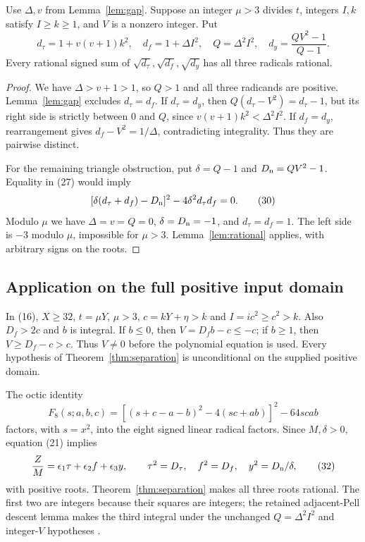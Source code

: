 \begin{theorem}
\label{thm:separation}
Use $\Delta,v$ from Lemma~\ref{lem:gap}. Suppose an integer $\mu>3$
divides $t$, integers $I,k$ satisfy $I\ge k\ge1$, and $V$ is a
nonzero integer. Put
\[
d_\tau=1+v(v+1)k^2,\quad d_f=1+\Delta I^2,\quad
Q=\Delta^2I^2,\quad d_y=\frac{QV^2-1}{Q-1}.
\tag{29}
\]
Every rational signed sum of $\sqrt{d_\tau},\sqrt{d_f},\sqrt{d_y}$
has all three radicals rational.
\end{theorem}

\begin{proof}
We have $\Delta>v+1>1$, so $Q>1$ and all three radicands are positive.
Lemma~\ref{lem:gap} excludes $d_\tau=d_f$.
If $d_\tau=d_y$, then $Q(d_\tau-V^2)=d_\tau-1$,
but its right side is strictly between 0 and $Q$, since
$v(v+1)k^2<\Delta^2I^2$.
If $d_f=d_y$, rearrangement gives $d_f-V^2=1/\Delta$,
contradicting integrality. Thus they are pairwise distinct.

For the remaining triangle obstruction, put $\delta=Q-1$ and
$D_{\rm n}=QV^2-1$. Equality in (27) would imply
\[
[\delta(d_\tau+d_f)-D_{\rm n}]^2-4\delta^2d_\tau d_f=0.
\tag{30}
\]
Modulo $\mu$ we have $\Delta=v=Q=0$,
$\delta=D_{\rm n}=-1$, and $d_\tau=d_f=1$.
The left side is $-3$ modulo $\mu$, impossible for $\mu>3$.
Lemma~\ref{lem:rational} applies, with arbitrary signs on the roots.
\end{proof}

\subsection{Application on the full positive input domain}

In (16), $X\ge32$, $t=\mu Y$, $\mu>3$, $c=kY+\eta>k$ and
$I=ic^2\ge c^2>k$. Also $D_f>2c$ and $b$ is integral.
If $b\le0$, then $V=D_fb-c\le-c$; if $b\ge1$, then
$V\ge D_f-c>c$. Thus $V\ne0$ before the polynomial equation is used.
Every hypothesis of Theorem~\ref{thm:separation} is unconditional on the
supplied positive domain.

The octic identity
\[
F_8(s;a,b,c)=[(s+c-a-b)^2-4(sc+ab)]^2-64scab
\tag{31}
\]
factors, with $s=x^2$, into the eight signed linear radical factors.
Since $M,\delta>0$, equation (21) implies
\[
\frac ZM=\epsilon_1\tau+\epsilon_2 f+\epsilon_3 y,\qquad
\tau^2=D_\tau,\quad f^2=D_f,\quad y^2=D_{\rm n}/\delta,
\tag{32}
\]
with positive roots.
Theorem~\ref{thm:separation} makes all three roots rational.
The first two are integers because their squares are integers; the
retained adjacent-Pell descent lemma makes the third integral under the
unchanged $Q=\Delta^2I^2$ and integer-$V$ hypotheses \cite{zero}.

